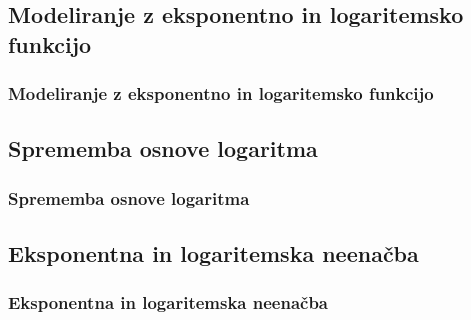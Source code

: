     \subsection{Modeliranje z eksponentno in logaritemsko funkcijo}

        \begin{frame}
            \frametitle{Modeliranje z eksponentno in logaritemsko funkcijo}
        \end{frame}

    \subsection{Sprememba osnove logaritma}

        \begin{frame}
            \frametitle{Sprememba osnove logaritma}
        \end{frame}

    \subsection{Eksponentna in logaritemska neenačba}

        \begin{frame}
            \frametitle{Eksponentna in logaritemska neenačba}
        \end{frame}


